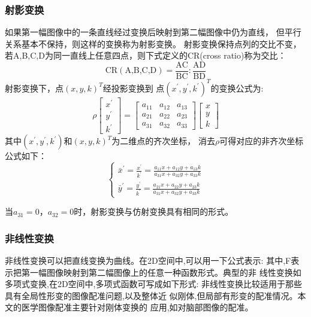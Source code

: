 \subsubsection{射影变换}
如果第一幅图像中的一条直线经过变换后映射到第二幅图像中仍为直线，
但平行关系基本不保持，则这样的变换称为射影变换。
射影变换保持点列的交比不变，
若A,B,C,D为同一直线上任意四点，则下式定义的CR(cross ratio)称为交比：
\begin{equation}
  \text{CR}(\text{A,B,C,D})=
  \frac{\text{AC}}{\text{BC}}:\frac{\text{AD}}{\text{BD}}
\end{equation}
射影变换下，点$(x,y,k)^T$经投影变换到
点$(x^\prime,y^\prime,k^\prime)^T$的变换公式为:
\begin{equation}
  \rho
  \begin{bmatrix}
    x^\prime\\y^\prime\\k^\prime
  \end{bmatrix}=
  \begin{bmatrix}
    a_{11}& a_{12}& a_{13}\\
    a_{21}& a_{22}& a_{23}\\
    a_{31}& a_{32}& a_{33}
  \end{bmatrix}
  \begin{bmatrix}
    x\\y\\k
  \end{bmatrix}
\end{equation}
其中$(x^\prime,y^\prime,k^\prime)$和$(x,y,k)^T$为二维点的齐次坐标，
消去$\rho$可得对应的非齐次坐标公式如下：
\begin{equation}
  \begin{cases}
    \bar{x}^\prime=\frac{x^\prime}{k^\prime}=
    \frac{a_{11}x+a_{12}y+a_{13}k}{a_{31}x+a_{32}y+a_{33}k}\\
    \bar{y}^\prime=\frac{y^\prime}{k^\prime}=
    \frac{a_{21}x+a_{22}y+a_{23}k}{a_{31}x+a_{32}y+a_{33}k}
  \end{cases}
\end{equation}

当$a_{31}=0$，$a_{32}=0$时，射影变换与仿射变换具有相同的形式。
\subsubsection{非线性变换}
非线性变换可以把直线变换为曲线。在2D空间中,可以用一下公式表示:
其中,F表示把第一幅图像映射到第二幅图像上的任意一种函数形式。典型的非
线性变换如多项式变换,在2D空间中,多项式函数可写成如下形式:
非线性变换比较适用于那些具有全局性形变的图像配准问题,以及整体近
似刚体,但局部有形变的配准情况。本文的医学图像配准主要针对刚体变换的
应用,如对脑部图像的配准。

